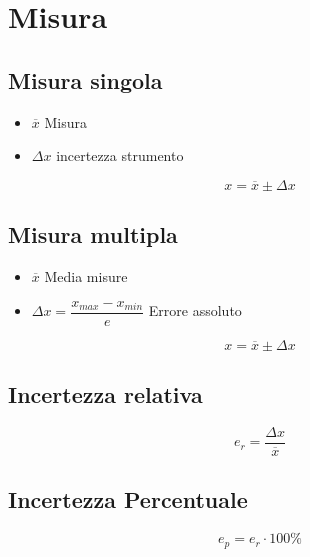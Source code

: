 \chapter{Misura}
\section{Misura singola}
\begin{itemize}
	\item $\overline{x}$ Misura
	\item $\Delta x$ incertezza strumento
\end{itemize}
\[x=\overline{x}\pm\Delta x\]
\section{Misura multipla}
\begin{itemize}
	\item $\overline{x}$ Media misure
	\item $\Delta x=\dfrac{x_{max}-x_{min}}{e}$ Errore assoluto
\end{itemize}
\[x=\overline{x}\pm\Delta x\]
\section{Incertezza relativa}
\[e_r=\dfrac{\Delta x}{\overline{x}}\]
\section{Incertezza Percentuale}
\[e_p=e_r\cdot 100\%\]
